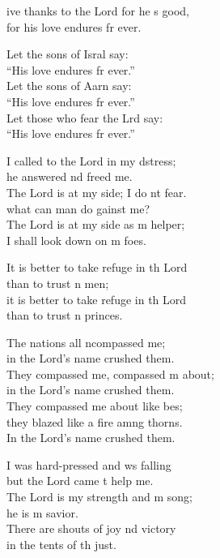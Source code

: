 \settowidth{\versewidth}{I shall not die, I shall live and recount his deeds.}
\begin{psalmverse}%
  \begin{patverse}
    ive thanks to the Lord for he \pointup{\i}s good,\Med\\
    for his love endures fr ever.

    Let the sons of Isral say:\Med\\
    “His love endures fr ever.”\\
    Let the sons of Aarn say:\Med\\
    “His love endures fr ever.”\\
    Let those who fear the Lrd say:\Med\\
    “His love endures fr ever.”

    I called to the Lord in my d\pointup{\i}stress;\Med\\
    he answered nd freed me.\\
    The Lord is at my side; I do nt fear.\Med\\
    what can man do gainst me?\\
    The Lord is at my side as m helper;\Med\\
    I shall look down on m foes.

    It is better to take refuge in th Lord\Med\\
    than to trust \pointup{\i}n men;\\
    it is better to take refuge in th Lord\Med\\
    than to trust \pointup{\i}n princes.

    The nations all ncompassed me;\Med\\
    in the Lord’s name  crushed them.\\
    They compassed me, compassed m about;\Med\\
    in the Lord’s name  crushed them.\\
    They compassed me about like bes;\Flex\\
    they blazed like a fire amng thorns.\Med\\
    In the Lord’s name  crushed them.

    I was hard-pressed and ws falling\Med\\
    but the Lord came t help me.\\
    The Lord is my strength and m song;\Med\\
    he is m savior.\\
    There are shouts of joy nd victory\Med\\
    in the tents of th just.


\end{patverse}
\end{psalmverse}
